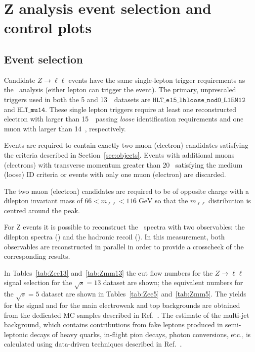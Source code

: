 \section{Z analysis event selection and control plots}
\label{sec:Zselection}

\subsection{Event selection}
\label{subsec:zselection}

Candidate $Z \rightarrow \ell\ell$ events have the same single-lepton trigger requirements as the \Wboson\ analysis (either lepton can trigger the event). The primary, unprescaled triggers used in both the 5 and 13~\TeV\ datasets are $\texttt{HLT\_e15\_lhloose\_nod0\_L1EM12}$ and $\texttt{HLT\_mu14}$. These single lepton triggers require at least one reconstructed electron with \ET larger than 15~\GeV\ passing \emph{loose} identification requirements and one muon with \ET larger than 14~\GeV, respectively.

Events are required to contain exactly two muon (electron) candidates satisfying the criteria described in Section~\ref{sec:objects}.
Events with additional muons (electrons) with transverse momentum greater than 20~\GeV{} satisfying the medium (loose) ID criteria or events with only one muon (electron) are discarded.

The two muon (electron) candidates are required to be of opposite charge with a dilepton invariant mass of $66<m_{\ell\ell}<116 \textrm{ GeV}$ so that the $m_{\ell\ell}$ distribution is centred around the \Zboson peak.

For Z events it is possible to reconstruct the \ptz\ spectra with two observables: the dilepton spectra (\ptdilep ) and the hadronic recoil (\ut). In this \pTZ measurement, both observables are reconstructed in parallel in order to provide a crosscheck of the corresponding \Wboson results.

In Tables~\ref{tab:Zee13} and~\ref{tab:Zmm13} the cut flow numbers for the $Z \rightarrow \ell\ell$ signal selection for the $\sqrt{s} = 13$ \lowmu dataset are shown; the equivalent numbers for the $\sqrt{s} = 5$ \lowmu dataset are shown in Tables~\ref{tab:Zee5} and~\ref{tab:Zmm5}.
The yields for the signal and for the main electroweak and top backgrounds are obtained from the dedicated MC samples described in Ref.~\cite{Kretzschmar:2657141}.
The estimate of the multi-jet background, which contains contributions from fake leptons produced in semi-leptonic decays of heavy quarks, in-flight pion decays, photon conversions, etc., is calculated using data-driven techniques described in Ref.~\cite{Xu:2657146}.

